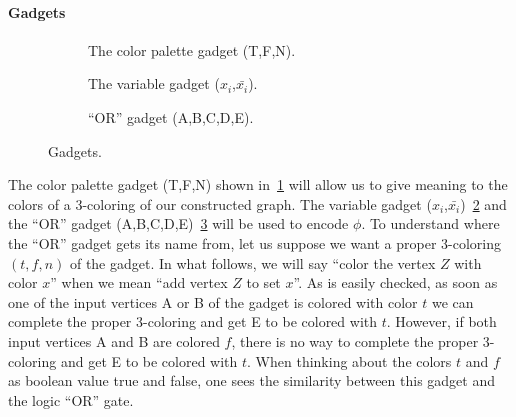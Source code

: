 \paragraph{Gadgets}
\begin{figure}
    \centering
    \begin{subfigure}[t]{0.333\textwidth}
        \centering
	\caption{The color palette gadget (T,F,N).}\label{fig:ga:pa}
    \end{subfigure}%
    \begin{subfigure}[t]{0.333\textwidth}
        \centering
	\caption{The variable gadget ($x_i$,$\bar{x_i}$).}\label{fig:ga:va}
    \end{subfigure}%
    \begin{subfigure}[t]{0.333\textwidth}
        \centering
	\caption{``OR'' gadget (A,B,C,D,E).}\label{fig:ga:or}
    \end{subfigure}
    \caption{Gadgets.}\label{fig:ga}
\end{figure}
The color palette gadget (T,F,N) shown in~\ref{fig:ga:pa} will allow us to give meaning
to the colors of a 3-coloring of our constructed graph.
The variable gadget ($x_i$,$\bar{x_i}$)~\ref{fig:ga:va} and the ``OR'' gadget
(A,B,C,D,E)~\ref{fig:ga:or} will be used to encode $\phi$. To understand where
the ``OR'' gadget gets its name from, let us suppose we want a proper 3-coloring
$(t,f,n)$ of the gadget. In what follows, we will say ``color the
vertex $Z$ with color $x$'' when we mean ``add vertex $Z$ to set $x$''. As is
easily checked, as soon as one of the input vertices A or B of the gadget is
colored with color $t$ we can complete the proper 3-coloring and get E to be
colored with $t$. However, if both input vertices A and B are colored $f$,
there is no way to complete the proper 3-coloring and get E to be colored
with $t$. When thinking about the colors $t$ and $f$ as boolean value true and
false, one sees the similarity between this gadget and the logic ``OR'' gate.

